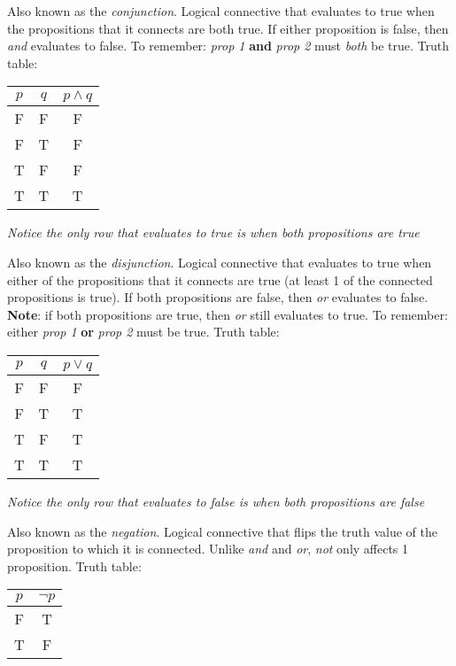 \documentclass[main.tex]{subfiles}
\begin{document}
\begin{defn}
	Also known as the \textit{conjunction}. Logical connective that evaluates to true when the propositions that it connects are both true. If either proposition is false, then \textit{and} evaluates to false. To remember: \textit{prop 1} \textbf{and} \textit{prop 2} must \textit{both} be true. Truth table:
	\begin{center}
		\begin{tabular}{c|c|c}
			\(p\) & \(q\) & \(p \land q\) \\
			\hline
			F & F & F \\
			F & T & F \\
			T & F & F \\
			T & T & T
		\end{tabular}
	\end{center}
	
	\textit{Notice the only row that evaluates to true is when both propositions are true}
\end{defn}

\begin{defn}[Or \(\lor\)]
	Also known as the \textit{disjunction}. Logical connective that evaluates to true when either of the propositions that it connects are true (at least 1 of the connected propositions is true). If both propositions are false, then \textit{or} evaluates to false. \textbf{Note}: if both propositions are true, then \textit{or} still evaluates to true. To remember: either \textit{prop 1} \textbf{or} \textit{prop 2} must be true. Truth table:
	\begin{center}
		\begin{tabular}{c|c|c}
			\(p\) & \(q\) & \(p \lor q\) \\
			\hline
			F & F & F \\
			F & T & T \\
			T & F & T \\
			T & T & T
		\end{tabular}
	\end{center}
	
	\textit{Notice the only row that evaluates to false is when both propositions are false}
\end{defn}

\begin{defn}
	Also known as the \textit{negation}. Logical connective that flips the truth value of the proposition to which it is connected. Unlike \textit{and} and \textit{or}, \textit{not} only affects 1 proposition. Truth table:
	\begin{center}
		\begin{tabular}{c|c}
			\(p\) & \(\lnot p\) \\
			\hline
			F & T \\
			T & F \\
		\end{tabular}
	\end{center}
\end{defn}
\end{document}
